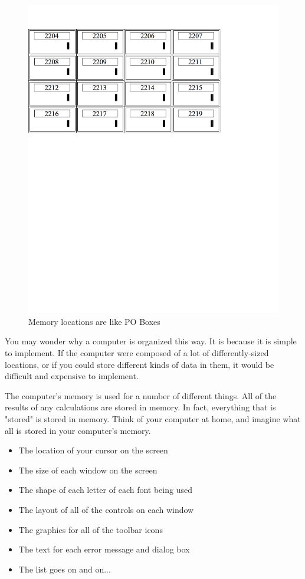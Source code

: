 \begin{figure}
\caption{Memory locations are like PO Boxes}
\includegraphics[width=\textwidth]{mailbox.png}
\end{figure}

You may wonder why a computer is organized this way.  It is because
it is simple to implement.  If the computer were composed of
a lot of differently-sized locations, or if you could store different
kinds of data in them, it would be difficult and expensive to
implement.

The computer's memory is used for a number of different things.  
All of the results of any calculations are stored in memory.  In fact,
everything that is "stored" is stored in memory.  Think of your computer
at home, and imagine what all is stored in your computer's memory.

\begin{itemize}\item The location of your cursor on the screen 
\item The size of each window on the screen 
\item The shape of each letter of each font being used 
\item The layout of all of the controls on each window 
\item The graphics for all of the toolbar icons 
\item The text for each error message and dialog box 
\item The list goes on and on... 
\end{itemize}

